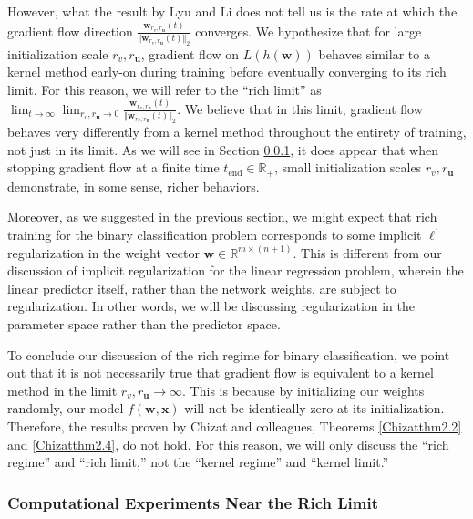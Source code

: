 \documentclass{article}
\begin{document}
However, what the result by Lyu and Li does not tell us is the rate at which the gradient flow direction $\frac{\boldsymbol{w}_{r_v, r_{\boldsymbol{u}}}(t)}{\Vert \boldsymbol{w}_{r_v, r_{\boldsymbol{u}}}(t) \Vert_2}$ converges. We hypothesize that for large initialization scale $r_v, r_{\boldsymbol{u}}$, gradient flow on $L(h(\boldsymbol{w}))$ behaves similar to a kernel method early-on during training before eventually converging to its rich limit. For this reason, we will refer to the \enquote{rich limit} as $\lim_{t \to \infty} \lim_{r_v, r_{\boldsymbol{u}} \to 0} \frac{\boldsymbol{w}_{r_v, r_{\boldsymbol{u}}}(t)}{\Vert \boldsymbol{w}_{r_v, r_{\boldsymbol{u}}}(t) \Vert_2}$. We believe that in this limit, gradient flow behaves very differently from a kernel method throughout the entirety of training, not just in its limit. As we will see in Section \ref{logregcomputation}, it does appear that when stopping gradient flow at a finite time $t_{\text{end}} \in \mathbb{R}_+$, small initialization scales $r_v, r_{\boldsymbol{u}}$ demonstrate, in some sense, richer behaviors.

Moreover, as we suggested in the previous section, we might expect that rich training for the binary classification problem corresponds to some implicit $\ell^1$ regularization in the weight vector $\boldsymbol{w} \in \mathbb{R}^{m \times (n+1)}$. This is different from our discussion of implicit regularization for the linear regression problem, wherein the linear predictor itself, rather than the network weights, are subject to regularization. In other words, we will be discussing regularization in the parameter space rather than the predictor space.

To conclude our discussion of the rich regime for binary classification, we point out that it is not necessarily true that gradient flow is equivalent to a kernel method in the limit $r_v, r_{\boldsymbol{u}} \rightarrow \infty$. This is because by initializing our weights randomly, our model $f(\boldsymbol{w}, \boldsymbol{x})$ will not be identically zero at its initialization. Therefore, the results proven by Chizat and colleagues, Theorems \ref{Chizatthm2.2} and \ref{Chizatthm2.4}, do not hold. For this reason, we will only discuss the \enquote{rich regime} and \enquote{rich limit,} not the \enquote{kernel regime} and \enquote{kernel limit.}


\subsubsection{Computational Experiments Near the Rich Limit}\label{logregcomputation}
\end{document}
